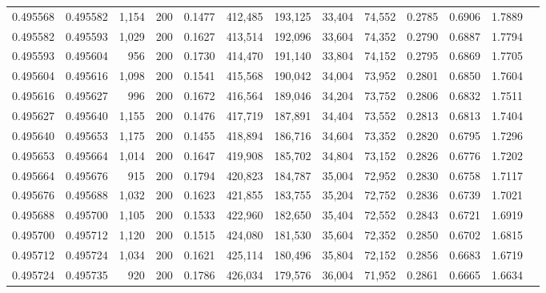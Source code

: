 \begin{tabular}{rrrrrrrrrrrrr}
0.495568 & 0.495582 &  1,154 & 200 &                                     0.1477 & 412,485 & 193,125 &  33,404 &  74,552 & 0.2785 & 0.6906 & 1.7889 \\
0.495582 & 0.495593 &  1,029 & 200 &                                     0.1627 & 413,514 & 192,096 &  33,604 &  74,352 & 0.2790 & 0.6887 & 1.7794 \\
0.495593 & 0.495604 &    956 & 200 &                                     0.1730 & 414,470 & 191,140 &  33,804 &  74,152 & 0.2795 & 0.6869 & 1.7705 \\
0.495604 & 0.495616 &  1,098 & 200 &                                     0.1541 & 415,568 & 190,042 &  34,004 &  73,952 & 0.2801 & 0.6850 & 1.7604 \\
0.495616 & 0.495627 &    996 & 200 &                                     0.1672 & 416,564 & 189,046 &  34,204 &  73,752 & 0.2806 & 0.6832 & 1.7511 \\
0.495627 & 0.495640 &  1,155 & 200 &                                     0.1476 & 417,719 & 187,891 &  34,404 &  73,552 & 0.2813 & 0.6813 & 1.7404 \\
0.495640 & 0.495653 &  1,175 & 200 &                                     0.1455 & 418,894 & 186,716 &  34,604 &  73,352 & 0.2820 & 0.6795 & 1.7296 \\
0.495653 & 0.495664 &  1,014 & 200 &                                     0.1647 & 419,908 & 185,702 &  34,804 &  73,152 & 0.2826 & 0.6776 & 1.7202 \\
0.495664 & 0.495676 &    915 & 200 &                                     0.1794 & 420,823 & 184,787 &  35,004 &  72,952 & 0.2830 & 0.6758 & 1.7117 \\
0.495676 & 0.495688 &  1,032 & 200 &                                     0.1623 & 421,855 & 183,755 &  35,204 &  72,752 & 0.2836 & 0.6739 & 1.7021 \\
0.495688 & 0.495700 &  1,105 & 200 &                                     0.1533 & 422,960 & 182,650 &  35,404 &  72,552 & 0.2843 & 0.6721 & 1.6919 \\
0.495700 & 0.495712 &  1,120 & 200 &                                     0.1515 & 424,080 & 181,530 &  35,604 &  72,352 & 0.2850 & 0.6702 & 1.6815 \\
0.495712 & 0.495724 &  1,034 & 200 &                                     0.1621 & 425,114 & 180,496 &  35,804 &  72,152 & 0.2856 & 0.6683 & 1.6719 \\
0.495724 & 0.495735 &    920 & 200 &                                     0.1786 & 426,034 & 179,576 &  36,004 &  71,952 & 0.2861 & 0.6665 & 1.6634 \\

\end{tabular}
